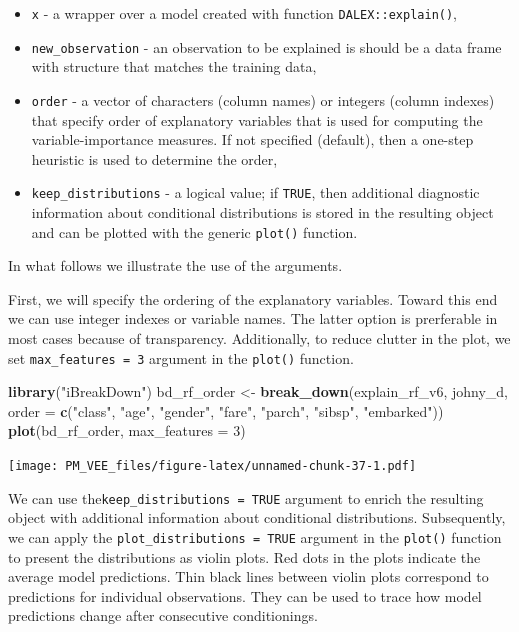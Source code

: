\documentclass[12pt,]{krantz}
\newenvironment{Shaded}{\begin{snugshade}}{\end{snugshade}}
\newcommand{\DataTypeTok}[1]{\textcolor[rgb]{0.13,0.29,0.53}{#1}}
\newcommand{\DecValTok}[1]{\textcolor[rgb]{0.00,0.00,0.81}{#1}}
\newcommand{\KeywordTok}[1]{\textcolor[rgb]{0.13,0.29,0.53}{\textbf{#1}}}
\newcommand{\NormalTok}[1]{#1}
\newcommand{\StringTok}[1]{\textcolor[rgb]{0.31,0.60,0.02}{#1}}
\providecommand{\tightlist}{%
  \setlength{\itemsep}{0pt}\setlength{\parskip}{0pt}}
\begin{document}
\begin{itemize}
\tightlist
\item
  \texttt{x} - a wrapper over a model created with function \texttt{DALEX::explain()},
\item
  \texttt{new\_observation} - an observation to be explained is should be a data frame with structure that matches the training data,
\item
  \texttt{order} - a vector of characters (column names) or integers (column indexes) that specify order of explanatory variables that is used for computing the variable-importance measures. If not specified (default), then a one-step heuristic is used to determine the order,
\item
  \texttt{keep\_distributions} - a logical value; if \texttt{TRUE}, then additional diagnostic information about conditional distributions is stored in the resulting object and can be plotted with the generic \texttt{plot()} function.
\end{itemize}

In what follows we illustrate the use of the arguments.

First, we will specify the ordering of the explanatory variables. Toward this end we can use integer indexes or variable names. The latter option is prerferable in most cases because of transparency. Additionally, to reduce clutter in the plot, we set \texttt{max\_features\ =\ 3} argument in the \texttt{plot()} function.

\begin{Shaded}
\begin{Highlighting}[]
\KeywordTok{library}\NormalTok{(}\StringTok{"iBreakDown"}\NormalTok{)}
\NormalTok{bd_rf_order <-}\StringTok{ }\KeywordTok{break_down}\NormalTok{(explain_rf_v6,}
\NormalTok{                 johny_d,}
                 \DataTypeTok{order =} \KeywordTok{c}\NormalTok{(}\StringTok{"class"}\NormalTok{, }\StringTok{"age"}\NormalTok{, }\StringTok{"gender"}\NormalTok{, }\StringTok{"fare"}\NormalTok{, }\StringTok{"parch"}\NormalTok{, }\StringTok{"sibsp"}\NormalTok{, }\StringTok{"embarked"}\NormalTok{))}
\KeywordTok{plot}\NormalTok{(bd_rf_order, }\DataTypeTok{max_features =} \DecValTok{3}\NormalTok{) }
\end{Highlighting}
\end{Shaded}

\texttt{[image: PM\_VEE\_files/figure-latex/unnamed-chunk-37-1.pdf]}

We can use the\texttt{keep\_distributions\ =\ TRUE} argument to enrich the resulting object with additional information about conditional distributions. Subsequently, we can apply the \texttt{plot\_distributions\ =\ TRUE} argument in the \texttt{plot()} function to present the distributions as violin plots. Red dots in the plots indicate the average model predictions. Thin black lines between violin plots correspond to predictions for individual observations. They can be used to trace how model predictions change after consecutive conditionings.
\end{document}
